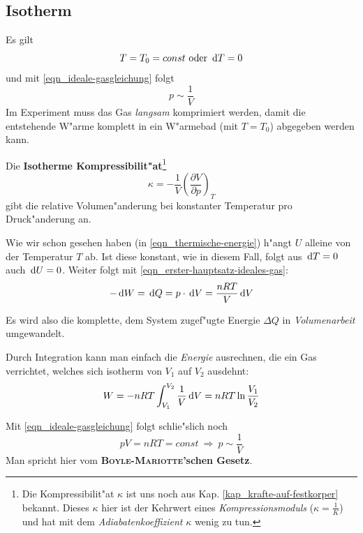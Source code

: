 \subsection{Isotherm}
\label{kap_isotherm}

Es gilt
$$
T = T_0 = const \text{ oder } {\ensuremath{\, \mathrm{d}}T= 0}
$$
und mit \eqref{eqn_ideale-gasgleichung} folgt 
$$
p \sim \frac{1}{V}
$$
Im Experiment muss das Gas \emph{langsam} komprimiert werden, damit
die entstehende W"arme komplett in ein W"armebad (mit $T = T_0$)
abgegeben werden kann.

Die \textbf{Isotherme Kompressibilit"at}\footnote{Die
Kompressibilit"at $\kappa$ ist uns noch aus
Kap. \ref{kap_krafte-auf-festkorper} bekannt. Dieses $\kappa$ hier ist
der Kehrwert eines \emph{Kompressionsmoduls} ($\kappa = \frac{1}{K}$)
und hat mit dem \emph{Adiabatenkoeffizient} $\kappa$ wenig zu tun.}
\begin{equation}
   \label{eqn_Isotherme-kompressibilit"at}
   \kappa = - \frac{1}{V} \left ( \frac{\partial V}{\partial p} \right )_T
\end{equation}
gibt die relative Volumen"anderung bei konstanter Temperatur pro
Druck"anderung an.

Wie wir schon gesehen haben (in \eqref{eqn_thermische-energie}) h"angt
$U$ alleine von der Temperatur $T$ ab. Ist diese konstant, wie in
diesem Fall, folgt aus $\, \mathrm{d} T = 0$ auch $\, \mathrm{d} U = 0$.  Weiter folgt mit
\eqref{eqn_erster-hauptsatz-ideales-gas}:
\begin{equation}
   \label{eqn_isotherm_unnere-energie}
   -\, \mathrm{d} W = \, \mathrm{d} Q = p \cdot \, \mathrm{d} V = \frac{nRT}{V}\, \mathrm{d} V
\end{equation}
\begin{Wichtig}
Es wird also die komplette, dem System zugef"ugte Energie $\Delta Q$ in
\emph{Volumenarbeit} umgewandelt.   
\end{Wichtig}
%
%
Durch Integration kann man einfach die \emph{Energie} ausrechnen, die
ein Gas verrichtet, welches sich isotherm von $V_1$ auf $V_2$
ausdehnt:
\begin{equation}
   \label{eq:3}
W = - nRT \int_{ V_1 }^{ V_2 } \frac{1}{V}\, \mathrm{d} V = nRT \ln \frac{V_1}{V_2}   
\end{equation}




Mit \eqref{eqn_ideale-gasgleichung} folgt schlie"slich noch
\begin{equation}
   pV = nRT = const ~\Rightarrow ~ p \sim \frac{1}{V}
\end{equation}
Man spricht hier vom \textbf{\textsc{Boyle}-\textsc{Mariotte}'schen Gesetz}.




